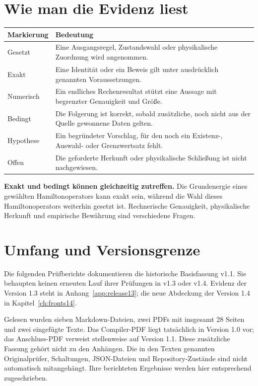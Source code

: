 \documentclass[11pt,a4paper,oneside,parskip=half,headings=normal]{scrreprt}
\begin{document}
\section*{Wie man die Evidenz liest}
\par\noindent\begin{tabularx}{\linewidth}{L{27mm}Y}
\toprule
\textbf{Markierung}&\textbf{Bedeutung}\\\midrule
Gesetzt&Eine Ausgangsregel, Zustandswahl oder physikalische Zuordnung wird angenommen.\\
Exakt&Eine Identität oder ein Beweis gilt unter ausdrücklich genannten Voraussetzungen.\\
Numerisch&Ein endliches Rechenresultat stützt eine Aussage mit begrenzter Genauigkeit und Größe.\\
Bedingt&Die Folgerung ist korrekt, sobald zusätzliche, noch nicht aus der Quelle gewonnene Daten gelten.\\
Hypothese&Ein begründeter Vorschlag, für den noch ein Existenz-, Auswahl- oder Grenzwertsatz fehlt.\\
Offen&Die geforderte Herkunft oder physikalische Schließung ist nicht nachgewiesen.\\\bottomrule
\end{tabularx}\par

\textbf{Exakt und bedingt können gleichzeitig zutreffen.} Die Grundenergie eines gewählten Hamiltonoperators kann exakt sein, während die Wahl dieses Hamiltonoperators weiterhin gesetzt ist. Rechnerische Genauigkeit, physikalische Herkunft und empirische Bewährung sind verschiedene Fragen.

\section*{Umfang und Versionsgrenze}
Die folgenden Prüfberichte dokumentieren die historische Basisfassung v1.1. Sie behaupten keinen erneuten Lauf ihrer Prüfungen in v1.3 oder v1.4. Evidenz der Version 1.3 steht in Anhang~\ref{app:release13}; die neue Abdeckung der Version 1.4 in Kapitel~\ref{ch:fronts14}.

Gelesen wurden sieben Markdown-Dateien, zwei PDFs mit insgesamt 28 Seiten und zwei eingefügte Texte. Das Compiler-PDF liegt tatsächlich in Version 1.0 vor; das Anschluss-PDF verweist stellenweise auf Version 1.1. Diese zusätzliche Fassung gehört nicht zu den Anhängen. Die in den Texten genannten Originalprüfer, Schaltungen, JSON-Dateien und Repository-Zustände sind nicht automatisch mitangehängt. Ihre berichteten Ergebnisse werden hier entsprechend zugeschrieben.
\end{document}
